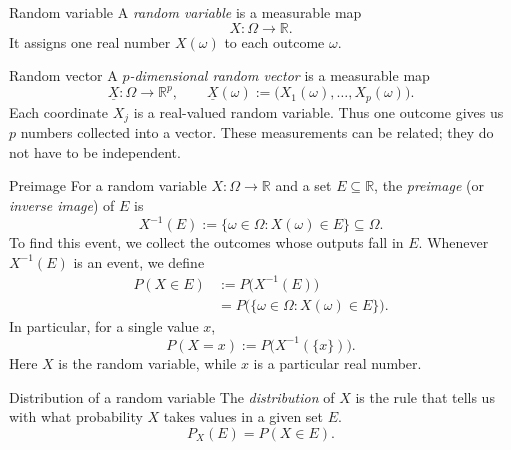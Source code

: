\documentclass[12pt,a4paper,oneside]{report}
\begin{document}
\begin{frameddefn}{Random variable}\label{def:random-variable}
A \emph{random variable} is a measurable map
\[
  X:\Omega\longrightarrow\mathbb R.
\]
It assigns one real number $X(\omega)$ to each outcome $\omega$.
\end{frameddefn}

\begin{frameddefn}{Random vector}\label{def:random-vector}
A \emph{$p$-dimensional random vector} is a measurable map
\[
  \underline{X}:\Omega\longrightarrow\mathbb R^p,
  \qquad
  \underline{X}(\omega)
    :=\bigl(X_1(\omega),\ldots,X_p(\omega)\bigr).
\]
Each coordinate $X_j$ is a real-valued random variable. Thus one
outcome gives us $p$ numbers collected into a vector. These measurements
can be related; they do not have to be independent.
\end{frameddefn}

\begin{frameddefn}{Preimage}\label{def:preimage}
For a random variable $X:\Omega\to\mathbb R$ and a set
$E\subseteq\mathbb R$, the \emph{preimage} (or \emph{inverse image}) of
$E$ is
\[
  X^{-1}(E):=\{\omega\in\Omega:X(\omega)\in E\}\subseteq\Omega.
\]
To find this event, we collect the outcomes whose outputs fall in $E$.
Whenever $X^{-1}(E)$ is an event, we define
\[
  \begin{aligned}
    P(X\in E)&:=P\bigl(X^{-1}(E)\bigr)\\
              &=P\bigl(\{\omega\in\Omega:X(\omega)\in E\}\bigr).
  \end{aligned}
\]
In particular, for a single value $x$,
\[
  P(X=x):=P\bigl(X^{-1}(\{x\})\bigr).
\]
Here $X$ is the random variable, while $x$ is a particular real number.
\end{frameddefn}

\begin{frameddefn}{Distribution of a random variable}
\label{def:distribution}
The \emph{distribution} of $X$ is the rule that tells us with what
probability $X$ takes values in a given set $E$.
\[
  P_X(E)=P(X\in E).
\]
\end{frameddefn}
\end{document}
